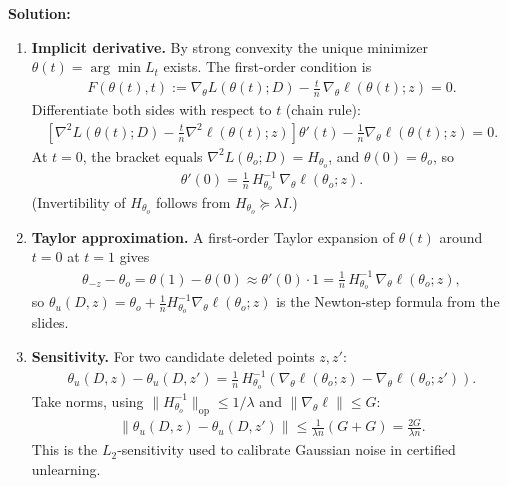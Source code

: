 \documentclass[12pt]{article}
\begin{document}
\begin{enumerate}
\begin{solution}
{\bf Solution:}\\
\begin{enumerate}
    \item \textbf{Implicit derivative.} By strong convexity the unique minimizer $\theta(t) = \arg\min L_t$ exists. The first-order condition is
    \begin{align*}
        F(\theta(t), t) := \nabla_\theta L(\theta(t); D) - \frac{t}{n}\,\nabla_\theta \ell(\theta(t); z) = 0.
    \end{align*}
    Differentiate both sides with respect to $t$ (chain rule):
    \begin{align*}
        \left[\nabla^2 L(\theta(t); D) - \frac{t}{n}\nabla^2 \ell(\theta(t); z)\right]\theta'(t) - \frac{1}{n}\nabla_\theta \ell(\theta(t); z) = 0.
    \end{align*}
    At $t = 0$, the bracket equals $\nabla^2 L(\theta_o; D) = H_{\theta_o}$, and $\theta(0) = \theta_o$, so
    \begin{align*}
        \theta'(0) = \frac{1}{n}\, H_{\theta_o}^{-1}\, \nabla_\theta \ell(\theta_o; z).
    \end{align*}
    (Invertibility of $H_{\theta_o}$ follows from $H_{\theta_o} \succeq \lambda I$.)

    \item \textbf{Taylor approximation.} A first-order Taylor expansion of $\theta(t)$ around $t = 0$ at $t = 1$ gives
    \begin{align*}
        \theta_{-z} - \theta_o = \theta(1) - \theta(0) \approx \theta'(0) \cdot 1 = \frac{1}{n}\, H_{\theta_o}^{-1}\, \nabla_\theta \ell(\theta_o; z),
    \end{align*}
    so $\theta_u(D, z) = \theta_o + \frac{1}{n}H_{\theta_o}^{-1}\nabla_\theta \ell(\theta_o; z)$ is the Newton-step formula from the slides.

    \item \textbf{Sensitivity.} For two candidate deleted points $z, z'$:
    \begin{align*}
        \theta_u(D, z) - \theta_u(D, z') = \frac{1}{n}\, H_{\theta_o}^{-1}\!\left(\nabla_\theta\ell(\theta_o; z) - \nabla_\theta\ell(\theta_o; z')\right).
    \end{align*}
    Take norms, using $\|H_{\theta_o}^{-1}\|_{\mathrm{op}} \le 1/\lambda$ and $\|\nabla_\theta \ell\| \le G$:
    \begin{align*}
        \|\theta_u(D, z) - \theta_u(D, z')\| \le \frac{1}{\lambda n}(G + G) = \frac{2 G}{\lambda n}.
    \end{align*}
    This is the $L_2$-sensitivity used to calibrate Gaussian noise in certified unlearning.
\end{enumerate}
\end{solution}


\end{enumerate}
\end{document}
